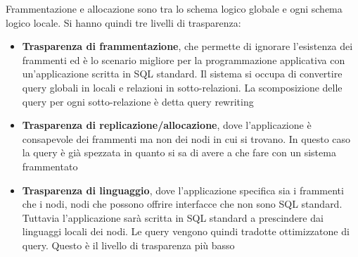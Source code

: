 Frammentazione e allocazione sono tra lo schema logico globale e ogni schema
logico locale. Si hanno quindi tre livelli di trasparenza:
\begin{itemize}
    \item \textbf{Trasparenza di frammentazione}, che permette di ignorare
          l'esistenza dei frammenti ed è lo scenario migliore per la programmazione
          applicativa con un'applicazione scritta in SQL standard. Il sistema si
          occupa di convertire query globali in locali e relazioni in sotto-relazioni.
          La scomposizione delle query per ogni sotto-relazione è detta query rewriting
    \item \textbf{Trasparenza di replicazione/allocazione}, dove l'applicazione
          è consapevole dei frammenti ma non dei nodi in cui si trovano. In questo
          caso la query è già spezzata in quanto si sa di avere a che fare con un
          sistema frammentato
    \item \textbf{Trasparenza di linguaggio}, dove l'applicazione specifica sia i
          frammenti che i nodi, nodi che possono offrire interfacce che non sono
          SQL standard. Tuttavia l'applicazione sarà scritta in SQL standard a
          prescindere dai linguaggi locali dei nodi. Le query vengono quindi tradotte
          ottimizzatone di query. Questo è il livello di trasparenza più basso
\end{itemize}
